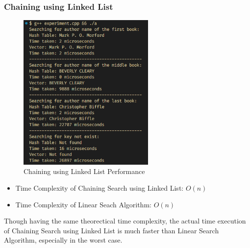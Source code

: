 \subsubsection*{Chaining using Linked List}
\begin{figure}[H]
	\centering
	\includegraphics[width=0.6\textwidth]{images/chaining_ll/experiment.png}
	\caption{Chaining using Linked List Performance}
\end{figure}
\begin{itemize}
	\item Time Complexity of Chaining Search using Linked List: \(O(n)\)
	\item Time Complexity of Linear Seach Algorithm: \(O(n)\)
\end{itemize}
Though having the same theorectical time complexity, the actual time execution of Chaining Search using Linked List is much faster than Linear Search Algorithm, especially in the worst case.

